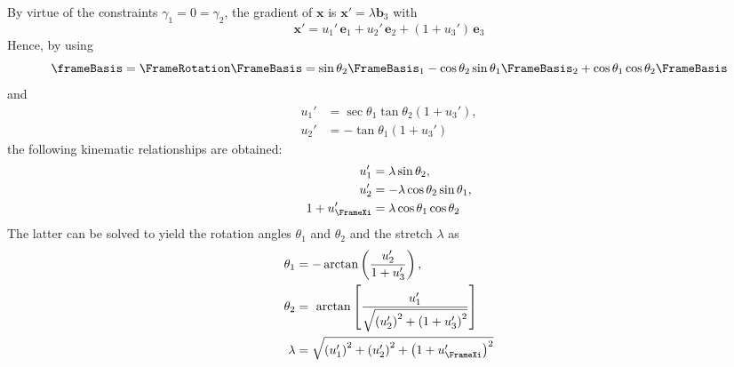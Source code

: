 %
By virtue of the constraints $\gamma_1=0=\gamma_2$, the gradient of $\bm{x}$ is $\bm{x}' = \lambda \mathbf{b}_3$ with 
$$
\bm{x}' = u_1'\, \mathbf{e}_1+ u_2'\, \mathbf{e}_2+ \left(1+ u_3'\right)\, \mathbf{e}_3
$$
Hence, by using 
\begin{equation*}
\frameBasis = \FrameRotation \FrameBasis
=\sin \theta_2 \FrameBasis_1-\cos \theta_2 \sin \theta_1 \FrameBasis_2+\cos \theta_1 \cos \theta_2 \FrameBasis
\end{equation*}
and
$$
\begin{aligned}
u_1' &= \sec \theta_1 \tan \theta_2\left(1+ u_3' \right), \\
u_2' &=-\tan \theta_1 \left(1+ u_3'\right)
\end{aligned}
$$
the following kinematic relationships are obtained:
$$
\begin{aligned}
  u_1' & =  \lambda  \sin \theta_2, \\
  u_2' & = -\lambda  \cos \theta_2 \sin \theta_1, \\
1+u_{\FrameXi}' & =  \lambda  \cos \theta_1 \cos \theta_2
\end{aligned}
$$
The latter can be solved to yield the rotation angles $\theta_1$ and $\theta_2$ and the stretch \(\lambda\) as
$$
\begin{aligned}
\theta_1 & =-\arctan \left(\frac{u_2'}{1+u_3'}\right), \\
\theta_2&=~\arctan \left[\frac{u_1'}{\sqrt{\left(u_2'\right)^2+\left(1+ u_3'\right)^2}}\right] \\
\lambda & =\sqrt{\left(u_1'\right)^2+\left(u_2'\right)^2+\left(1+u_{\FrameXi}'\right)^2}
\end{aligned}
$$

